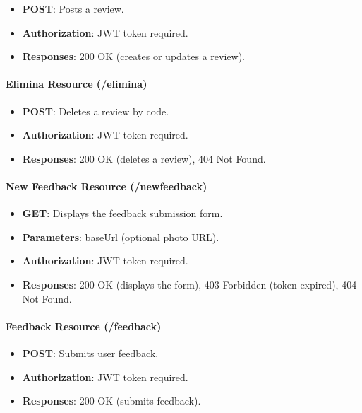 \documentclass[../main.tex]{subfiles}
\begin{document}
\begin{itemize}
  \item \textbf{POST}: Posts a review.
  \item \textbf{Authorization}: JWT token required.
  \item \textbf{Responses}: 200 OK (creates or updates a review).
\end{itemize}

\paragraph{Elimina Resource (/elimina)}

\begin{itemize}
  \item \textbf{POST}: Deletes a review by code.
  \item \textbf{Authorization}: JWT token required.
  \item \textbf{Responses}: 200 OK (deletes a review), 404 Not Found.
\end{itemize}

\paragraph{New Feedback Resource (/newfeedback)}

\begin{itemize}
  \item \textbf{GET}: Displays the feedback submission form.
  \item \textbf{Parameters}: baseUrl (optional photo URL).
  \item \textbf{Authorization}: JWT token required.
  \item \textbf{Responses}: 200 OK (displays the form), 403 Forbidden (token expired), 404 Not Found.
\end{itemize}

\paragraph{Feedback Resource (/feedback)}

\begin{itemize}
  \item \textbf{POST}: Submits user feedback.
  \item \textbf{Authorization}: JWT token required.
  \item \textbf{Responses}: 200 OK (submits feedback).
\end{itemize}
\end{document}
